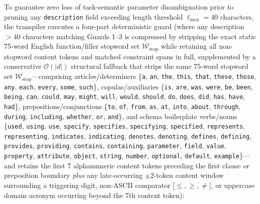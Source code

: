 \documentclass[conference,10pt]{IEEEtran}
\begin{document}
To guarantee zero loss of task-semantic parameter disambiguation prior to pruning any \texttt{description} field exceeding length threshold $\ell_{\max} = 40$ characters, the transpiler executes a four-part deterministic guard (where any description $> 40$ characters matching Guards 1--3 is compressed by stripping the exact static 75-word English function/filler stopword set $\mathcal{W}_{\text{stop}}$ while retaining all non-stopword content tokens and matched constraint spans in full, supplemented by a conservative $\mathcal{O}(|d|)$ structural fallback that strips the same 75-word stopword set $\mathcal{W}_{\text{stop}}$---comprising articles/determiners \{\texttt{a}, \texttt{an}, \texttt{the}, \texttt{this}, \texttt{that}, \texttt{these}, \texttt{those}, \texttt{any}, \texttt{each}, \texttt{every}, \texttt{some}, \texttt{such}\}, copulas/auxiliaries \{\texttt{is}, \texttt{are}, \texttt{was}, \texttt{were}, \texttt{be}, \texttt{been}, \texttt{being}, \texttt{can}, \texttt{could}, \texttt{may}, \texttt{might}, \texttt{will}, \texttt{would}, \texttt{should}, \texttt{do}, \texttt{does}, \texttt{did}, \texttt{has}, \texttt{have}, \texttt{had}\}, prepositions/conjunctions \{\texttt{to}, \texttt{of}, \texttt{from}, \texttt{as}, \texttt{at}, \texttt{into}, \texttt{about}, \texttt{through}, \texttt{during}, \texttt{including}, \texttt{whether}, \texttt{or}, \texttt{and}\}, and schema boilerplate verbs/nouns \{\texttt{used}, \texttt{using}, \texttt{use}, \texttt{specify}, \texttt{specifies}, \texttt{specifying}, \texttt{specified}, \texttt{represents}, \texttt{representing}, \texttt{indicates}, \texttt{indicating}, \texttt{denotes}, \texttt{denoting}, \texttt{defines}, \texttt{defining}, \texttt{provides}, \texttt{providing}, \texttt{contains}, \texttt{containing}, \texttt{parameter}, \texttt{field}, \texttt{value}, \texttt{property}, \texttt{attribute}, \texttt{object}, \texttt{string}, \texttt{number}, \texttt{optional}, \texttt{default}, \texttt{example}\}---and retains the first 7 alphanumeric content tokens preceding the first clause or preposition boundary \emph{plus} any late-occurring $\pm 2$-token content window surrounding a triggering digit, non-ASCII comparator [$\le, \ge, \neq$], or uppercase domain acronym occurring beyond the 7th content token):
\end{document}
